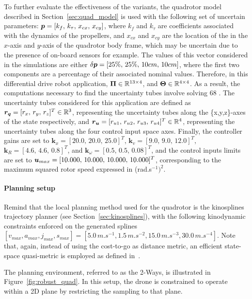 To further evaluate the effectiveness of the  variants, the quadrotor model described in Section~\ref{sec:quad_model} is used with the following set of uncertain parameters: $\boldsymbol{p} = [k_{f}, \, k_{\tau}, \, x_{cx}, \, x_{cy}]$, where $k_{f}$ and $k_{\tau}$ are coefficients associated with the dynamics of the propellers, and $x_{cx}$ and $x_{cy}$ are the location of the  in the $x$-axis and $y$-axis of the quadrotor body frame, which may be uncertain due to the presence of on-board sensors for example.
The values of this vector considered in the simulations are either $\delta\boldsymbol{p} = [25\%, \, 25\%, \, 10cm, \, 10cm]$, where the first two components are a percentage of their associated nominal values. 
Therefore, in this differential drive robot application, $\boldsymbol{\Pi} \in \mathbb{R}^{13\times4}$, and $\boldsymbol{\Theta} \in \mathbb{R}^{4\times4}$.
As a result, the computations necessary to find the uncertainty tubes involve solving 68 .
The uncertainty tubes considered for this application are defined as $\boldsymbol{r_q} = [r_x, \, r_y, \, r_z]^T \in \mathbb{R}^3$, representing the uncertainty tubes along the \{x,y,z\}-axes of the state respectively, and $\boldsymbol{r_u} = [r_{u1}, \, r_{u2}, \, r_{u3}, \, r_{u4}]^T \in \mathbb{R}^4$, representing the uncertainty tubes along the four control input space axes.
Finally, the controller gains are set to $\boldsymbol{k}_{x} = [20.0, \, 20.0, \, 25.0]^T$, $\boldsymbol{k}_{v}= [9.0, \, 9.0, \, 12.0]^T$, $\boldsymbol{k}_{R}=[4.6, \, 4.6, \, 0.8]^T$, and $\boldsymbol{k}_{\omega}=[0.5, \, 0.5, \, 0.08]^T$, and the control inputs limits are set to $\boldsymbol{u}_{max} = [10.000, \, 10.000, \, 10.000, \, 10.000]^T$, corresponding to the maximum squared rotor speed expressed in (rad.s$^{-1})^2$.

\paragraph{Planning setup}

Remind that the local planning method used for the quadrotor is the kinosplines trajectory planner (see Section~\ref{sec:kinosplines}), with the following kinodynamic constraints enforced on the generated splines $[v_{max}, a_{max}, j_{max}, s_{max}] = [5.0 \, m.s^{-1}, \allowbreak 1.5 \, m.s^{-2}, \allowbreak 15.0 \, m.s^{-3}, \allowbreak 30.0 \, m.s^{-4}]$. 
Note that, again, instead of using the cost-to-go as distance metric, an efficient state-space quasi-metric is employed as defined in~\cite{cKino}.

The planning environment, referred to as the 2-Ways, is illustrated in Figure~\ref{fig:robust_quad}. 
In this setup, the drone is constrained to operate within a 2D plane by restricting the sampling to that plane.

